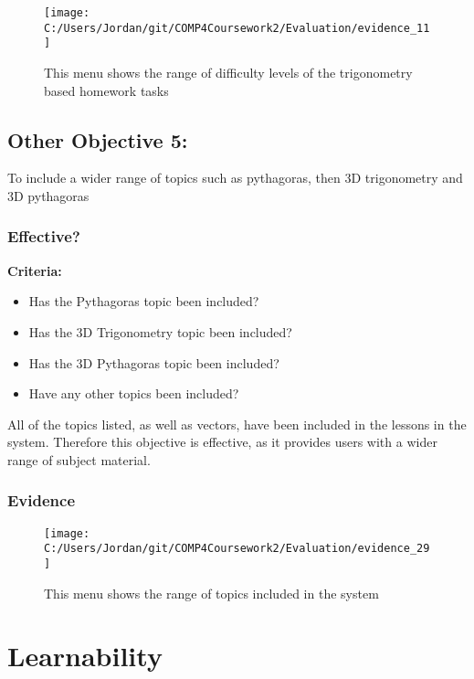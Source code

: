 \begin{figure}[H]
	\texttt{[image: C:/Users/Jordan/git/COMP4Coursework2/Evaluation/evidence\_11]}
	\caption{This menu shows the range of difficulty levels of the trigonometry based homework tasks}
\end{figure}

\subsection{Other Objective 5: }

To include a wider range of topics such as pythagoras, then 3D trigonometry and 3D pythagoras

\subsubsection{Effective?}

\textbf{Criteria: }

\begin{itemize}
	\item Has the Pythagoras topic been included?
	\item Has the 3D Trigonometry topic been included?
	\item Has the 3D Pythagoras topic been included?
	\item Have any other topics been included?
\end{itemize}

All of the topics listed, as well as vectors, have been included in the lessons in the system. Therefore this objective is effective, as it provides users with a wider range of subject material.

\subsubsection{Evidence}

\begin{figure}[H]
	\texttt{[image: C:/Users/Jordan/git/COMP4Coursework2/Evaluation/evidence\_29]}
	\caption{This menu shows the range of topics included in the system}
\end{figure}

\section{Learnability}

